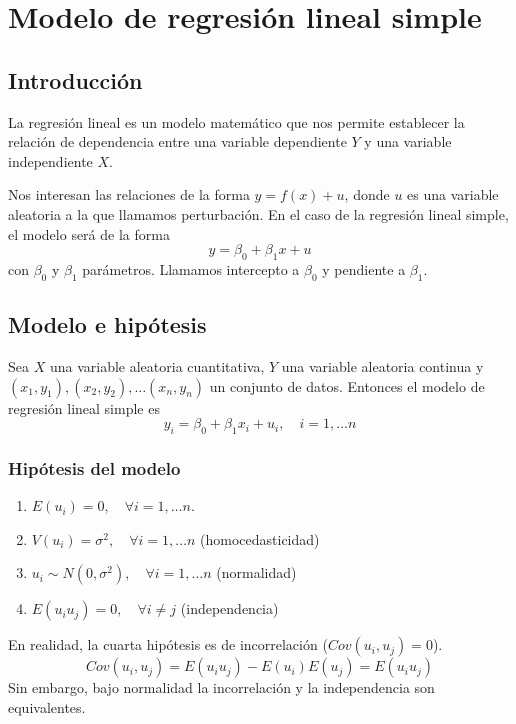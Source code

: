\chapter{Modelo de regresión lineal simple}
\section{Introducción}

La regresión lineal es un modelo matemático que nos permite establecer la relación de dependencia entre una variable dependiente $Y$ y una variable independiente $X$.

Nos interesan las relaciones de la forma $y = f(x) + u$, donde $u$ es una variable aleatoria a la que llamamos perturbación.
En el caso de la regresión lineal simple, el modelo será de la forma $$y = \beta_0 + \beta_1x + u$$
con $\beta_0$ y $\beta_1$ parámetros.
Llamamos intercepto a $\beta_0$ y pendiente a $\beta_1$.

\section{Modelo e hipótesis}
Sea $X$ una variable aleatoria cuantitativa, $Y$ una variable aleatoria continua y $(x_1, y_1), (x_2, y_2), \dots (x_n, y_n)$ un conjunto de datos.
Entonces el modelo de regresión lineal simple es
$$y_i = \beta_0 + \beta_1x_i + u_i, \quad i = 1, \dots n$$

\subsection*{Hipótesis del modelo}
\begin{enumerate}
    \item $E(u_i) = 0, \quad \forall i = 1, \dots n$.
    \item $V(u_i) = \sigma^2, \quad \forall i = 1, \dots n$ (homocedasticidad)
    \item $u_i \sim N(0, \sigma^2), \quad \forall i = 1, \dots n$ (normalidad)
    \item $E(u_i u_j) = 0, \quad \forall i \neq j$ (independencia)
\end{enumerate}

\begin{note}
    En realidad, la cuarta hipótesis es de incorrelación ($Cov(u_i, u_j) = 0$).
    $$Cov(u_i, u_j) = E(u_i u_j) - E(u_i)E(u_j) = E(u_i u_j)$$
    Sin embargo, bajo normalidad la incorrelación y la independencia son equivalentes.
\end{note}

